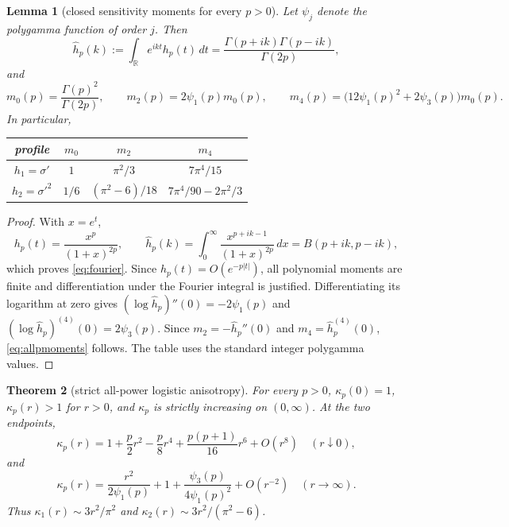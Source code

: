 \documentclass[11pt]{article}
\newtheorem{theorem}{Theorem}[section]
\newtheorem{lemma}[theorem]{Lemma}
\newcommand{\R}{\mathbb R}
\begin{document}
\begin{lemma}[closed sensitivity moments for every $p>0$]
\label{lem:moments}
Let $\psi_j$ denote the polygamma function of order $j$.  Then
\begin{equation}
 \widehat h_p(k):=\int_\R e^{ikt}h_p(t)\,dt
 =\frac{\Gamma(p+ik)\Gamma(p-ik)}{\Gamma(2p)},
 \label{eq:fourier}
\end{equation}
and
\begin{equation}
 m_0(p)=\frac{\Gamma(p)^2}{\Gamma(2p)},\qquad
 m_2(p)=2\psi_1(p)m_0(p),\qquad
 m_4(p)=\bigl(12\psi_1(p)^2+2\psi_3(p)\bigr)m_0(p).
 \label{eq:allpmoments}
\end{equation}
In particular,
\begin{center}
\begin{tabular}{c@{\qquad}ccc}
\toprule
profile & $m_0$ & $m_2$ & $m_4$\\
\midrule
$h_1=\sigma'$ & $1$ & $\pi^2/3$ & $7\pi^4/15$\\[2pt]
$h_2=\sigma'^2$ & $1/6$ & $(\pi^2-6)/18$ & $7\pi^4/90-2\pi^2/3$\\
\bottomrule
\end{tabular}
\end{center}
\end{lemma}

\begin{proof}
With $x=e^t$,
\[
 h_p(t)=\frac{x^p}{(1+x)^{2p}},\qquad
 \widehat h_p(k)=\int_0^\infty\frac{x^{p+ik-1}}{(1+x)^{2p}}\,dx
 =B(p+ik,p-ik),
\]
which proves \eqref{eq:fourier}.  Since $h_p(t)=O(e^{-p|t|})$, all polynomial moments are finite and
differentiation under the Fourier integral is justified.  Differentiating its logarithm at zero gives
$(\log\widehat h_p)''(0)=-2\psi_1(p)$ and
$(\log\widehat h_p)^{(4)}(0)=2\psi_3(p)$.  Since
$m_2=-\widehat h_p''(0)$ and $m_4=\widehat h_p^{(4)}(0)$,
\eqref{eq:allpmoments} follows.  The table uses the standard integer polygamma values.
\end{proof}

\begin{theorem}[strict all-power logistic anisotropy]
\label{thm:monotone}
For every $p>0$, $\kappa_p(0)=1$, $\kappa_p(r)>1$ for $r>0$, and $\kappa_p$ is strictly increasing on
$(0,\infty)$.  At the two endpoints,
\begin{equation}
 \kappa_p(r)=1+\frac p2r^2-\frac p8r^4+\frac{p(p+1)}{16}r^6+O(r^8)
 \quad(r\downarrow0),
 \label{eq:smallallp}
\end{equation}
and
\begin{equation}
 \kappa_p(r)=\frac{r^2}{2\psi_1(p)}
 +1+\frac{\psi_3(p)}{4\psi_1(p)^2}+O(r^{-2})
 \quad(r\to\infty).
 \label{eq:logisticconstants}
\end{equation}
Thus $\kappa_1(r)\sim3r^2/\pi^2$ and
$\kappa_2(r)\sim3r^2/(\pi^2-6)$.
\end{theorem}
\end{document}
